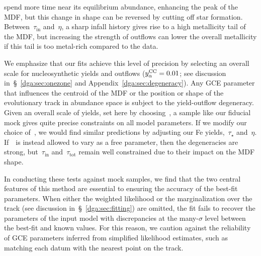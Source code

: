 spend more time near its equilibrium abundance, enhancing the peak of the MDF,
but this change in shape can be reversed by cutting off star formation.
Between~$\tau_\text{in}$ and~$\eta$, a sharp infall history gives rise to a
high metallicity tail of the MDF, but increasing the strength of outflows
can lower the overall metallicity if this tail is too metal-rich compared to
the data.
\par
We emphasize that our fits achieve this level of precision by selecting an
overall scale for nucleosynthetic yields and outflows ($y_\alpha^\text{CC} = 0.01$; see
discussion in~\S~\ref{dga:sec:onezone} and Appendix~\ref{dga:sec:degeneracy}).
Any GCE parameter that influences the centroid of the MDF or the position or
shape of the evolutionary track in abundance space is subject to the
yield-outflow degeneracy.
Given an overall scale of yields, set here by choosing~\yacc, a sample like
our fiducial mock gives quite precise constraints on all model parameters.
If we modify our choice of~\yacc, we would find similar predictions by
adjusting our Fe yields,~$\tau_\star$ and~$\eta$.
If~\yacc~is instead allowed to vary as a free parameter, then the degeneracies
are strong, but~$\tau_\text{in}$ and~$\tau_\text{tot}$ remain well constrained
due to their impact on the MDF shape.
\par
In conducting these tests against mock samples, we find that the two central
features of this method are essential to ensuring the accuracy of the best-fit
parameters.
When either the weighted likelihood or the marginalization over the track
(see discussion in~\S~\ref{dga:sec:fitting}) are omitted, the fit fails to recover
the parameters of the input model with discrepancies at the many-$\sigma$ level
between the best-fit and known values.
For this reason, we caution against the reliability of GCE parameters inferred
from simplified likelihood estimates, such as matching each datum with the
nearest point on the track.



